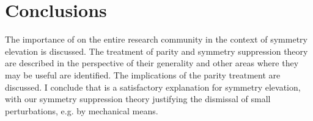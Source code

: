 \section{Conclusions}

The importance of \cite{hexagon} on the entire research community in the context of symmetry elevation is discussed. The treatment of parity and symmetry suppression theory are described in the perspective of their generality and other areas where they may be useful are identified. The implications of the parity treatment are discussed. I conclude that \cite{hexagon} is a satisfactory explanation for symmetry elevation, with our symmetry suppression theory justifying the dismissal of small perturbations, e.g. by mechanical means.
